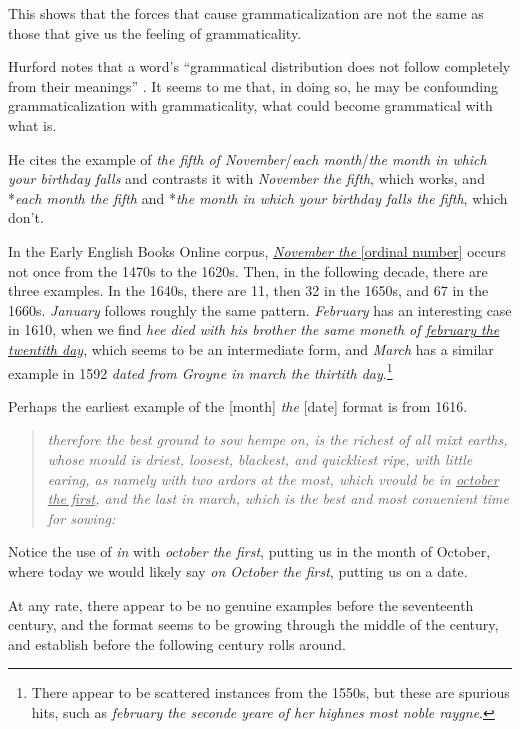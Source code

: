 This shows that the forces that cause grammaticalization are not the same as those that give us the feeling of grammaticality. 

Hurford notes that a word's ``grammatical distribution does not follow completely from their meanings'' \citet[302]{Hurford2012a}. It seems to me that, in doing so, he may be confounding grammaticalization with grammaticality, what could become grammatical with what is.

He cites the example of \textit{the fifth of November}/\textit{each month}/\textit{the month in which your birthday falls} and contrasts it with \textit{November the fifth}, which works, and *\textit{each month the fifth} and *\textit{the month in which your birthday falls the fifth}, which don't.

In the Early English Books Online corpus, \uline{\textit{November the} [ordinal number]} occurs not once from the 1470s to the 1620s. Then, in the following decade, there are three examples. In the 1640s, there are 11, then 32 in the 1650s, and 67 in the 1660s. \textit{January} follows roughly the same pattern. \textit{February} has an interesting case in 1610, when we find \textit{hee died with his brother the same moneth of \uline{february the twentith day}}, which seems to be an intermediate form, and \textit{March} has a similar example in 1592 \textit{dated from Groyne in march the thirtith day}.\footnote{There appear to be scattered instances from the 1550s, but these are spurious hits, such as \textit{february the seconde yeare of her highnes most noble raygne}.}

Perhaps the earliest example of the [month] \textit{the} [date] format is from 1616.  

\begin{quote}
    \textit{therefore the best ground to sow hempe on, is the richest of all mixt earths, whose mould is driest, loosest, blackest, and quickliest ripe, with little earing, as namely with two ardors at the most, which vvould be in \uline{october the first}, and the last in march, which is the best and most conuenient time for sowing: }
\end{quote}

Notice the use of \textit{in} with \textit{october the first}, putting us in the month of October, where today we would likely say \textit{on October the first}, putting us on a date.

At any rate, there appear to be no genuine examples before the seventeenth century, and the format seems to be growing through the middle of the century, and establish before the following century rolls around.

